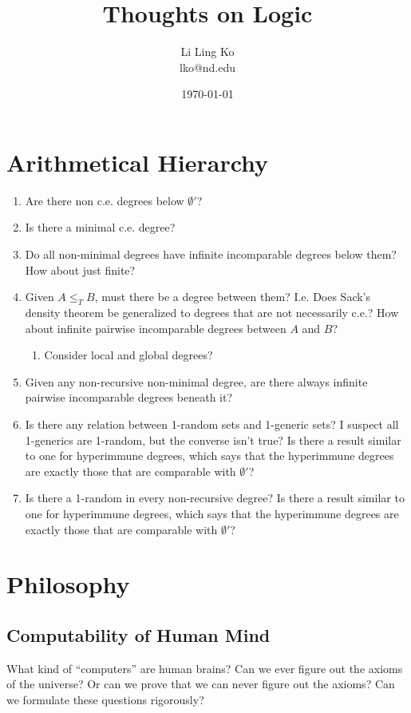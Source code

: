 \documentclass{article}
\begin{document}
\title{Thoughts on Logic}
\author{Li Ling Ko\\ lko@nd.edu}
\date{\today}
\maketitle

\section{Arithmetical Hierarchy}
  \begin{enumerate}
    \item Are there non c.e. degrees below $\emptyset'$?

    \item Is there a minimal c.e. degree?

    \item Do all non-minimal degrees have infinite incomparable degrees
      below them? How about just finite?

    \item Given $A\leq_T B$, must there be a degree between them? I.e. Does
      Sack's density theorem be generalized to degrees that are not
      necessarily c.e.? How about infinite pairwise incomparable degrees
      between $A$ and $B$?

      \begin{enumerate}
        \item Consider local and global degrees?
      \end{enumerate}

    \item Given any non-recursive non-minimal degree, are there always
      infinite pairwise incomparable degrees beneath it?

    \item Is there any relation between 1-random sets and 1-generic sets? I
      suspect all 1-generics are 1-random, but the converse isn't true? Is
      there a result similar to one for hyperimmune degrees, which says
      that the hyperimmune degrees are exactly those that are comparable
      with $\emptyset'$?

    \item Is there a 1-random in every non-recursive degree? Is there a
      result similar to one for hyperimmune degrees, which says that the
      hyperimmune degrees are exactly those that are comparable with
      $\emptyset'$?
  \end{enumerate}

\section{Philosophy}
  \subsection{Computability of Human Mind}
    What kind of ``computers'' are human brains? Can we ever figure out the
    axioms of the universe? Or can we prove that we can never figure out
    the axioms? Can we formulate these questions rigorously?
\end{document}
